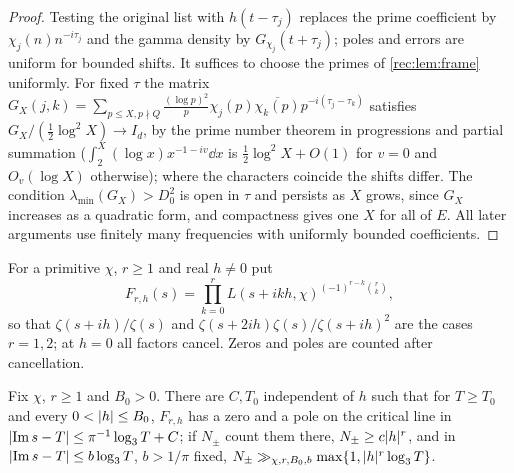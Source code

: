 \begin{proof}
Testing the original list with $h(t-\tau_j)$ replaces the prime coefficient by $\chi_j(n)n^{-i\tau_j}$
and the gamma density by $G_{\chi_j}(t+\tau_j)$; poles and errors are uniform for bounded shifts. It
suffices to choose the primes of \cref{rec:lem:frame} uniformly. For fixed $\tau$ the matrix
$G_X(j,k)=\sum_{p\le X,p\nmid Q}\frac{(\log p)^2}p\chi_j(p)\overline{\chi_k(p)}p^{-i(\tau_j-\tau_k)}$ satisfies
$G_X/(\tfrac12\log^2X)\to I_d$, by the prime number theorem in progressions and partial summation
($\int_2^X(\log x)x^{-1-iv}\dd x$ is $\tfrac12\log^2X+O(1)$ for $v=0$ and $O_v(\log X)$ otherwise); where the
characters coincide the shifts differ. The condition $\lambda_{\min}(G_X)>D_0^2$ is open in $\tau$ and
persists as $X$ grows, since $G_X$ increases as a quadratic form, and compactness gives one $X$ for
all of $E$. All later arguments use finitely many frequencies with uniformly bounded coefficients.
\end{proof}

For a primitive $\chi$, $r\ge1$ and real $h\ne0$ put
\[
 F_{r,h}(s)=\prod_{k=0}^rL(s+ikh,\chi)^{(-1)^{r-k}\binom rk},
\]
so that $\zeta(s+ih)/\zeta(s)$ and $\zeta(s+2ih)\zeta(s)/\zeta(s+ih)^2$ are the cases $r=1,2$; at $h=0$ all
factors cancel. Zeros and poles are counted after cancellation.

\begin{theorem}\label{rec:thm:coalesce}
Fix $\chi$, $r\ge1$ and $B_0>0$. There are $C,T_0$ independent of $h$ such that for $T\ge T_0$ and
every $0<\lvert h\rvert\le B_0$, $F_{r,h}$ has a zero and a pole on the critical line in
$\lvert\operatorname{Im} s-T\rvert\le\pi^{-1}\log_3T+C$; if $N_\pm$ count them there, $N_\pm\ge c\lvert h\rvert^r$, and in
$\lvert\operatorname{Im} s-T\rvert\le b\log_3T$, $b>1/\pi$ fixed, $N_\pm\gg_{\chi,r,B_0,b}\max\{1,\lvert h\rvert^r\log_3T\}$.
\end{theorem}

